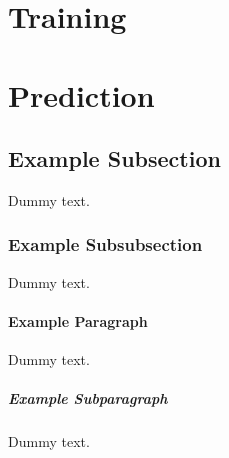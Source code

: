 \section{Training}
\section{Prediction}




\subsection{Example Subsection}

Dummy text.

\subsubsection{Example Subsubsection}

Dummy text.

\paragraph{Example Paragraph}

Dummy text.

\subparagraph{Example Subparagraph}

Dummy text.
